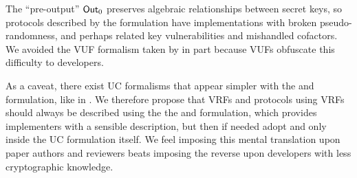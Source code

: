 The ``pre-output'' ${\mathsf{Out}}_0$ preserves algebraic relationships between
secret keys, so protocols described by the  formulation
have implementations with broken pseudo-randomness, and perhaps
 related key vulnerabilities and mishandled cofactors.
We avoided the VUF formalism taken by \cite{agg_dkg} in part because
 VUFs obfuscate this difficulty to developers.

As a caveat, there exist UC formalisms that appear simpler with
the  and  formulation, like in \cite{praos}.
We therefore propose that VRFs and protocols using VRFs should always be
described using the the \Sign and \Verify formulation, which provides
implementers with a sensible description, but then if needed adopt
  and  only inside the UC formulation itself.
We feel imposing this mental translation upon paper authors and reviewers
 beats imposing the reverse upon developers with less cryptographic knowledge.



\endinput 



\smallskip

There exist VUFs like RSA-FDH or BLS signatures that lack auxiliary data
Yet, these all suffer from either large signature sizes (RSA) or
 slow verification (BLS).

Instead, one prefers instantiating VRFs similarly to
 \cite{nsec5} or \cite{VXEd25519} using Chaum-Pedersen DLEQ proofs \cite{CP92} %
 because they provide both small signatures and fast verification.
In these, our auxiliary data \aux can be verified for free,
by binding \aux into the challenge hash, like a Schnorr signature.
VRF protocols could often reduce bandwidth and verifier time this way,
 but some like Sassafras depend upon \aux. 





\endinput %




